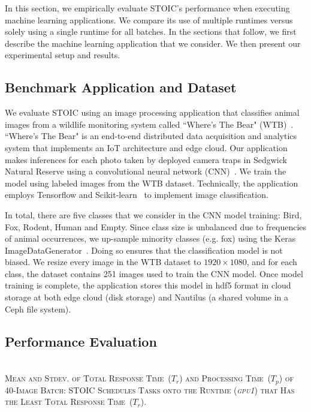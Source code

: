In this section, we empirically evaluate STOIC's performance when executing machine learning applications. We compare its use of multiple runtimes
versus solely using a single runtime for all batches.  In the sections
that follow, we first describe 
the machine learning application that we consider. We then
present our experimental setup and results. 

\subsection{Benchmark Application and Dataset}

We evaluate STOIC using an image processing application that classifies animal images from a wildlife monitoring system called ``Where's The Bear" (WTB)~\cite{ref:wtb}. ``Where's The Bear" is an end-to-end distributed data acquisition and analytics system that implements an IoT architecture and edge cloud. Our application makes inferences for each photo taken by deployed camera traps in Sedgwick Natural Reserve using a convolutional neural network (CNN)~\cite{ref:cnn}.  We train the model using labeled images from the WTB dataset. Technically, the application employs Tensorflow and Scikit-learn~\cite{ref:scikit} to implement 
image classification.  

In total, there are five classes that we consider in the CNN model training: Bird, Fox, Rodent, Human and Empty. Since class size is unbalanced due to frequencies of animal occurrences, we up-sample minority classes (e.g. fox) using the Keras ImageDataGenerator~\cite{ref:keras}.  Doing so ensures that the classification model is not biased. We resize every image in the WTB dataset to $1920 \times 1080$, and for each class, the dataset contains 251 images used to train the CNN model. Once model training is complete, the application stores this model in hdf5 format in cloud storage at both edge cloud (disk storage) and Nautilus (a shared volume in a Ceph file system).

\subsection{Performance Evaluation}

\begin{table}[t] 
\centering
\captionsetup{justification=centering}
\caption{ \hspace{0pt} \\
\textsc{Mean and Stdev. of Total Response Time~($T_r$) and Processing Time~($T_p$) of 40-Image Batch: STOIC Schedules Tasks onto the Runtime (\textit{gpu1}) that Has the Least Total Response Time~($T_r$).}}


\label{tab:validation}
\end{table}

